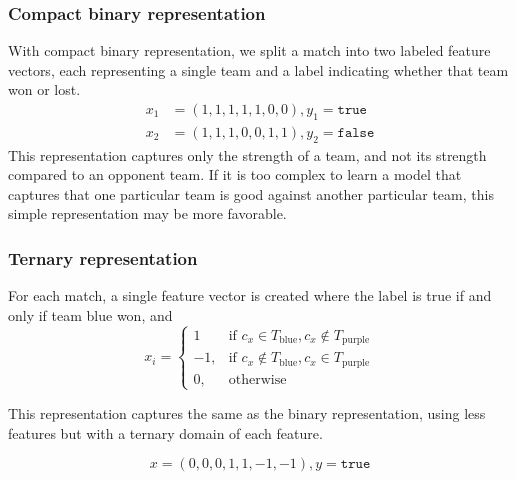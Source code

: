 \subsubsection{Compact binary representation}
With compact binary representation, we split a match into two labeled feature vectors, each representing a single team and a label indicating whether that team won or lost.
\begin{align*}
  x_1 &= (1,1,1,1,1,0,0), y_1 = \texttt{true} \\
  x_2 &= (1,1,1,0,0,1,1), y_2 =\texttt{false}
\end{align*}
This representation captures only the strength of a team, and not its strength compared to an opponent team.
If it is too complex to learn a model that captures that one particular team is good against another particular team, this simple representation may be more favorable.

\subsubsection{Ternary representation}
For each match, a single feature vector is created where the label is true if and only if team blue won, and
\[
    x_i = 
\begin{cases}
    1 				 & \text{if } c_x \in T_\text{blue}, c_x \not\in T_\text{purple}\\
    -1,              & \text{if } c_x \not\in T_\text{blue}, c_x \in T_\text{purple}\\
    0,              & \text{otherwise}
\end{cases}
\]

This representation captures the same as the binary representation, using less features but with a ternary domain of each feature.

\[x = (0,0,0,1,1,-1,-1), y = \texttt{true}\]



